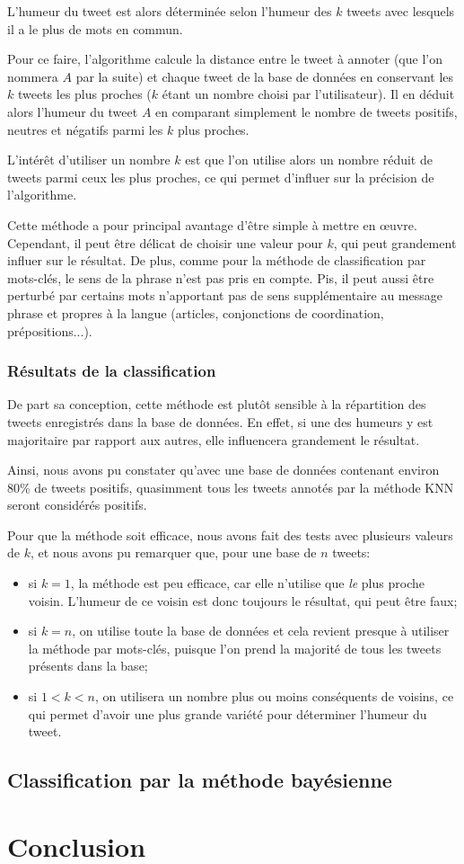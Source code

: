 \documentclass[12pt,a4paper]{report}
\begin{document}
L'humeur du tweet est alors déterminée selon l'humeur des $k$ tweets
avec lesquels il a le plus de mots en commun.

Pour ce faire, l'algorithme calcule la distance entre le tweet à annoter (que
l'on nommera $A$ par la suite) et chaque tweet de la base de données
en conservant les $k$ tweets les plus proches ($k$ étant un nombre
choisi par l'utilisateur). Il en déduit alors l'humeur du tweet $A$ en comparant
simplement le nombre de tweets positifs, neutres et négatifs parmi les $k$ plus
proches.

L'intérêt d'utiliser un nombre $k$ est que l'on utilise alors un nombre réduit
de tweets parmi ceux les plus proches, ce qui permet d'influer sur la précision
de l'algorithme.

Cette méthode a pour principal avantage d'être simple à mettre en œuvre.
Cependant, il peut être délicat de choisir une valeur pour $k$, qui peut
grandement influer sur le résultat. De plus, comme pour la méthode de
classification par mots-clés, le sens de la phrase n'est pas pris en compte.
Pis, il peut aussi être perturbé par certains mots n'apportant pas de sens
supplémentaire au message phrase et propres à la langue (articles, conjonctions
de coordination, prépositions...).

\subsection{Résultats de la classification}
De part sa conception, cette méthode est plutôt sensible à la répartition des
tweets enregistrés dans la base de données. En effet, si une des humeurs y est
majoritaire par rapport aux autres, elle influencera grandement le résultat.

Ainsi, nous avons pu constater qu'avec une base de données contenant environ
80\% de tweets positifs, quasimment tous les tweets annotés par la méthode KNN
seront considérés positifs.

Pour que la méthode soit efficace, nous avons fait des tests avec plusieurs
valeurs de $k$, et nous avons pu remarquer que, pour une base de $n$ tweets:

\begin{itemize}
    \item si $k=1$, la méthode est peu efficace, car elle n'utilise que
        \textit{le} plus proche voisin. L'humeur de ce voisin est donc
        toujours le résultat, qui peut être faux;
    \item si $k=n$, on utilise toute la base de données et cela revient presque
        à utiliser la méthode par mots-clés, puisque l'on prend la majorité de
        tous les tweets présents dans la base;
    \item si $1 < k < n$, on utilisera un nombre plus ou moins conséquents de
        voisins, ce qui permet d'avoir une plus grande variété pour déterminer
        l'humeur du tweet.
\end{itemize}

\section{Classification par la méthode bayésienne}


\chapter{Conclusion}
\end{document}
